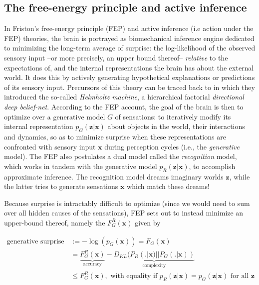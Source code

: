 \documentclass[10pt,letterpaper]{article}
\def\z{\mathbf{z}}
\def\x{\mathbf{x}}
\begin{document}
\subsection{The free-energy principle and active inference}
In Friston's free-energy principle (FEP) \citep{friston2010free} and active inference  (i.e action under the FEP) \citep{fristonAIorRL} theories, the brain is portrayed
as biomechanical inference engine
dedicated to minimizing the long-term average of surprise: the log-likelihood of the observed sensory input --or more precisely, an upper bound thereof-- \textit{relative} to the expectations of, and the internal representations the brain has about the external world. It does this by actively generating hypothetical explanations or predictions of its sensory input.
Precursors of this theory can be traced back to \citep{dayan1995helmholtz} in which they introduced the so-called \textit{Helmholtz machine}, a hierarchical factorial \textit{directional deep belief-net}. According to the FEP account,
the goal of the brain is then to optimize over a generative model $G$ of sensations: to iteratively
modify its internal representation $p_G(\z|\x)$ about objects in the world, their interactions and dynamics,
so as to minimize surprise when these representations are confronted with sensory input $\x$ during perception cycles (i.e., the \textit{generative} model).
The FEP also postulates a dual model called the \textit{recognition} model,
which works in tandem with the generative model $p_R(\z|\x)$, to accomplish approximate inference. The recognition model dreams imaginary worlds $\z$,
while the latter tries to generate sensations $\x$ which match these dreams!

Because surprise is intractably difficult to optimize (since we would need to sum over all hidden causes of the sensations), FEP sets out to instead minimize an upper-bound thereof,
namely the  $F_G^R(\x)$ given by

  \begin{equation}
    \begin{split}
      \text{generative surprise } &:= -\log(p_G(\x)) = F_G(\x) \\
      &=\underbrace{F^R_G(\x)}_{\text{accuracy}} - \underbrace{D_{KL}(P_R(.|\x) || P_G(.|\x))}_{\text{complexity}} \\
      &\le F^R_G(\x),
      \text{ with equality if }p_R(\z|\x) = p_G(\z|\x)\text{ for all } \z
    \end{split}
  \end{equation}
\end{document}
